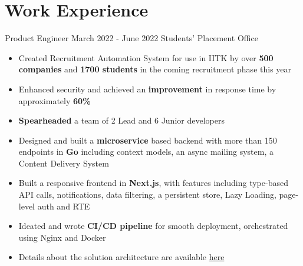 \section*{\sc Work Experience}
\vspace{-2mm}
\hrulefill
\vspace{1mm}

\excventry
{Product Engineer}
{March 2022 - June 2022}
{Students' Placement Office}
{
  \begin{itemize}
    \item Created Recruitment Automation System for use in IITK by over \textbf{500 companies} and \textbf{1700 students} in the coming recruitment phase this year  
    \item Enhanced security and achieved an \textbf{improvement} in response time by approximately \textbf{60\%}
    \item \textbf{Spearheaded} a team of 2 Lead and 6 Junior developers
    \item Designed and built a \textbf{microservice} based backend with more than 150 endpoints in \textbf{Go} including context models, an async mailing system, a Content Delivery System  
    \item Built a responsive frontend in \textbf{Next.js}, with features including type-based API calls, notifications, data filtering, a persistent store, Lazy Loading, page-level auth and RTE
    \item Ideated and wrote \textbf{CI/CD pipeline} for smooth deployment, orchestrated using Nginx and Docker
    \item Details about the solution architecture are available \href{https://abhishekshree.xyz/blog/engineering-ras}{here {\small \faExternalLink{}}}
  \end{itemize}
}


